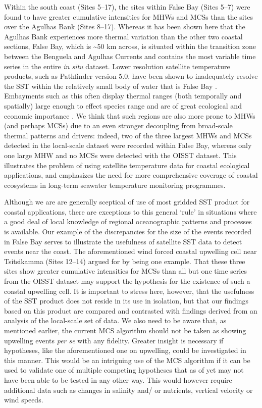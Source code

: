 \documentclass[a4paper,10pt,review]{elsarticle}
\begin{document}
Within the south coast (Sites 5--17), the sites within False Bay (Sites 5--7) were found to have greater cumulative intensities for MHWs and MCSs than the sites over the Agulhas Bank (Sites 8--17). Whereas it has been shown here that the Agulhas Bank experiences more thermal variation than the other two coastal sections, False Bay, which is \textasciitilde50 km across, is situated within the transition zone between the Benguela and Agulhas Currents \citep{Smit2013} and contains the most variable time series in the entire \emph{in situ} dataset. Lower resolution satellite temperature products, such as Pathfinder version 5.0, have been shown to inadequately resolve the SST within the relatively small body of water that is False Bay \citep{Dufois2012}. Embayments such as this often display thermal ranges (both temporally and spatially) large enough to effect species range \citep{Ling2009} and are of great ecological \citep{Klumb2003} and economic importance \citep{Lugendo2005}. We think that such regions are also more prone to MHWs (and perhaps MCSs) due to an even stronger decoupling from broad-scale thermal patterns and drivers: indeed, two of the three largest MHWs and MCSs detected in the local-scale dataset were recorded within False Bay, whereas only one large MHW and no MCSs were detected with the OISST dataset. This illustrates the problem of using satellite temperature data for coastal ecological applications, and emphasizes the need for more comprehensive coverage of coastal ecosystems in long-term seawater temperature monitoring programmes.

Although we are are generally sceptical of use of most gridded SST product for coastal applications, there are exceptions to this general `rule' in situations where a good deal of local knowledge of regional oceanographic patterns and processes is available. Our example of the discrepancies for the size of the events recorded in False Bay serves to illustrate the usefulness of satellite SST data to detect events near the coast. The aforementioned wind forced coastal upwelling cell near Tsitsikamma (Sites 12--14) argued for by \citet{Roberts2005} being one example. That these three sites show greater cumulative intensities for MCSs than all but one time series from the OISST dataset may support the hypothesis for the existence of such a coastal upwelling cell. It is important to stress here, however, that the usefulness of the SST product does not reside in its use in isolation, but that our findings based on this product are compared and contrasted with findings derived from an analysis of the local-scale set of data. We also need to be aware that, as mentioned earlier, the current MCS algorithm should not be taken as showing upwelling events \emph{per se} with any fidelity. Greater insight is necessary if hypotheses, like the aforementioned one on upwelling, could be investigated in this manner. This would be an intriguing use of the MCS algorithm if it can be used to validate one of multiple competing hypotheses that as of yet may not have been able to be tested in any other way. This would however require additional data such as changes in salinity and/ or nutrients, vertical velocity or wind speeds.
\end{document}
